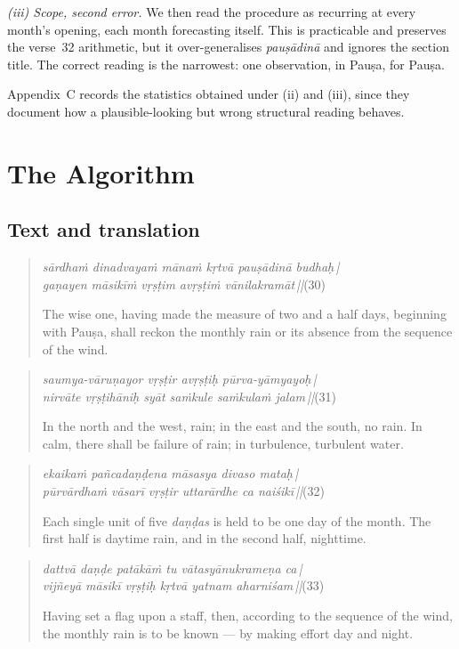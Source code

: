 \documentclass[11pt,a4paper]{article}
\newcommand{\skt}[1]{\textcolor{skt}{\textit{#1}}}
\newcommand{\dv}{\vspace{2pt}}
\begin{document}
\emph{(iii) Scope, second error.} We then read the procedure as recurring at every month's opening, each month forecasting itself. This is practicable and preserves the verse~32 arithmetic, but it over-generalises \skt{pauṣādinā} and ignores the section title. The correct reading is the narrowest: one observation, in Pauṣa, for Pauṣa.

Appendix~C records the statistics obtained under (ii) and (iii), since they document how a plausible-looking but wrong structural reading behaves.

\section{The Algorithm}

\subsection{Text and translation}

\begin{quote}\small
\skt{sārdhaṁ dinadvayaṁ mānaṁ kṛtvā pauṣādinā budhaḥ\,|}\\
\skt{gaṇayen māsikīṁ vṛṣṭim avṛṣṭiṁ vānilakramāt\,||}\hfill(30)
\dv

\noindent The wise one, having made the measure of two and a half days, beginning with Pauṣa, shall reckon the monthly rain or its absence from the sequence of the wind.
\end{quote}

\begin{quote}\small
\skt{saumya-vāruṇayor vṛṣṭir avṛṣṭiḥ pūrva-yāmyayoḥ\,|}\\
\skt{nirvāte vṛṣṭihāniḥ syāt saṁkule saṁkulaṁ jalam\,||}\hfill(31)
\dv

\noindent In the north and the west, rain; in the east and the south, no rain. In calm, there shall be failure of rain; in turbulence, turbulent water.
\end{quote}

\begin{quote}\small
\skt{ekaikaṁ pañcadaṇḍena māsasya divaso mataḥ\,|}\\
\skt{pūrvārdhaṁ vāsarī vṛṣṭir uttarārdhe ca naiśikī\,||}\hfill(32)
\dv

\noindent Each single unit of five \skt{daṇḍas} is held to be one day of the month. The first half is daytime rain, and in the second half, nighttime.
\end{quote}

\begin{quote}\small
\skt{dattvā daṇḍe patākāṁ tu vātasyānukrameṇa ca\,|}\\
\skt{vijñeyā māsikī vṛṣṭiḥ kṛtvā yatnam aharniśam\,||}\hfill(33)
\dv

\noindent Having set a flag upon a staff, then, according to the sequence of the wind, the monthly rain is to be known --- by making effort day and night.
\end{quote}
\end{document}

